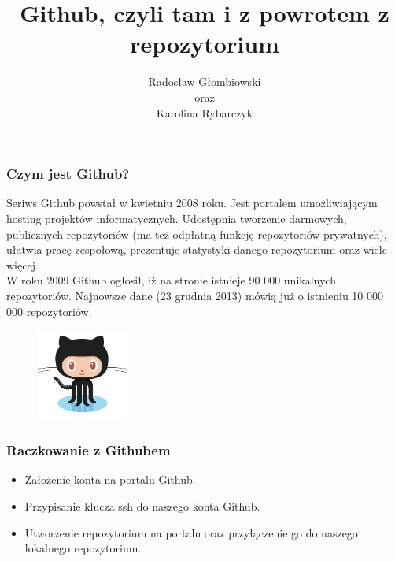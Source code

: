 \documentclass[9pt]{beamer}
\title[To w tym szablonie i tak nie działa]{\Huge Github, czyli tam i z powrotem z repozytorium}
\author{Radosław Głombiowski\\oraz\\Karolina Rybarczyk}
\institute{
Uniwesytet Gdański\\ 
\medskip
\textit{predoobcy@gmail.com, szprota@rybki.com.pl} 
}
\date{} %
\begin{document}
	\begin{frame}
		\titlepage
	\end{frame}






	\begin{frame}
		\frametitle{Czym jest Github?}
		Seriws Github powstał w kwietniu 2008 roku. Jest portalem umożliwiającym hosting projektów informatycznych. Udostępnia tworzenie darmowych, publicznych repozytoriów (ma też odpłatną funkcję repozytoriów prywatnych), ułatwia pracę zespołową, prezentuje statystyki danego repozytorium oraz wiele więcej.\\
		W roku 2009 Github ogłosił, iż na stronie istnieje 90 000 unikalnych repozytoriów. Najnowsze dane (23 grudnia 2013) mówią już o istnieniu 10 000 000 repozytoriów.
		
		
		
		
		\begin{figure}
			\centering
			\includegraphics[height=3cm]{Octocat.png}
		\end{figure}
		
		
		
	\end{frame}
	


	\begin{frame}
		\frametitle{Raczkowanie z Githubem}
		\begin{itemize}
			\item Założenie konta na portalu Github.
			\item Przypisanie klucza ssh do naszego konta Github.
			\item Utworzenie repozytorium na portalu oraz przyłączenie go do naszego lokalnego repozytorium.
		\end{itemize}
	\end{frame}

\end{document}
